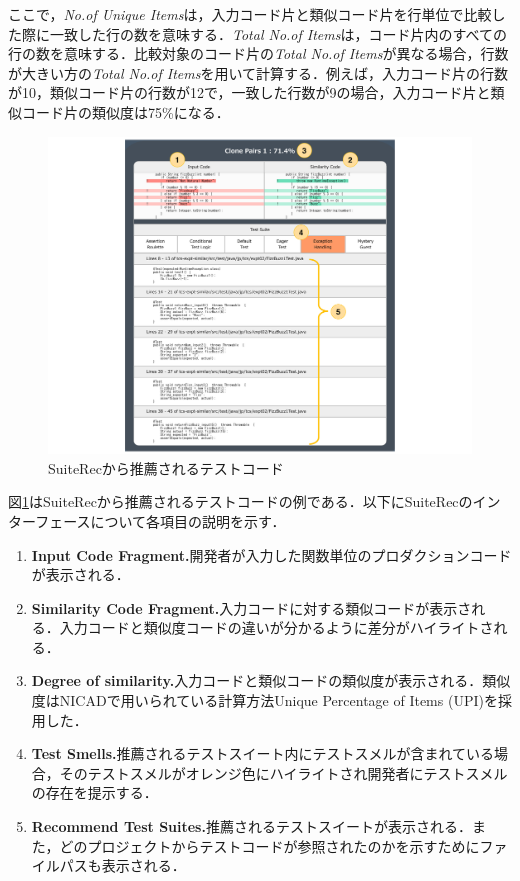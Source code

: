 \documentclass[12pt]{jarticle} %
\begin{document}
\vspace{\baselineskip}

ここで，{\it No.of Unique Items}は，入力コード片と類似コード片を行単位で比較した際に一致した行の数を意味する．{\it Total No.of Items}は，コード片内のすべての行の数を意味する．比較対象のコード片の{\it Total No.of Items}が異なる場合，行数が大きい方の{\it Total No.of Items}を用いて計算する．例えば，入力コード片の行数が10，類似コード片の行数が12で，一致した行数が9の場合，入力コード片と類似コード片の類似度は75\%になる．

\begin{figure}[htbp]
  \begin{center}
    \includegraphics[clip,width=15cm]{SuiteRec.pdf}
    \caption{{\sf SuiteRec}から推薦されるテストコード}
    \label{SR}
  \end{center}
\end{figure}

\newpage
図\ref{SR}は{\sf SuiteRec}から推薦されるテストコードの例である．以下に{\sf SuiteRec}のインターフェースについて各項目の説明を示す．


\begin{enumerate}
\renewcommand{\labelenumi}{(\arabic{enumi})}
\item{\textbf{Input Code Fragment.}開発者が入力した関数単位のプロダクションコードが表示される．}
\item{\textbf{Similarity Code Fragment.}入力コードに対する類似コードが表示される．入力コードと類似度コードの違いが分かるように差分がハイライトされる．}
\item{\textbf{Degree of similarity.}入力コードと類似コードの類似度が表示される．類似度はNICADで用いられている計算方法Unique Percentage of Items (UPI)を採用した．}
\item{\textbf{Test Smells.}推薦されるテストスイート内にテストスメルが含まれている場合，そのテストスメルがオレンジ色にハイライトされ開発者にテストスメルの存在を提示する．}
\item{\textbf{Recommend Test Suites.}推薦されるテストスイートが表示される．また，どのプロジェクトからテストコードが参照されたのかを示すためにファイルパスも表示される．}
\end{enumerate}
\end{document}
